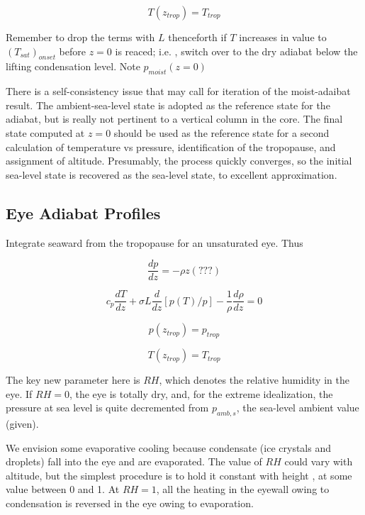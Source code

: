 \documentclass{article}
\begin{document}
\begin{equation}
	T(z_{trop} ) = T_{trop}
\end{equation}

Remember to drop the terms with $L$ thenceforth if $T$ increases in value to $(T_{sat})_{onset}$ before $z=0$ is reaced; i.e. , switch over to the dry adiabat below the lifting condensation level. Note $p_{moist}(z=0)$

There is a self-consistency issue that may call for iteration of the moist-adaibat result. The ambient-sea-level state is adopted as the reference state for the adiabat, but is really not pertinent to a vertical column in the core. The final state computed at $z=0$ should be used as the reference state for a second calculation of temperature vs pressure, identification of the tropopause, and assignment of altitude. Presumably, the process quickly converges, so the initial sea-level state is recovered as the sea-level state, to excellent approximation.

\subsection{Eye Adiabat Profiles}

Integrate seaward from the tropopause for an unsaturated eye. Thus

\begin{equation}
	\frac{dp}{dz} = - \rho z (???)
\end{equation}

\begin{equation}
	c_p \frac{dT}{dz} + \sigma L \frac{d}{dz} [ p(T) / p] - \frac{1}{\rho} \frac{d \rho}{d z} = 0
\end{equation}

\begin{equation}
	p(z_{trop}) = p_{trop} 
\end{equation}

\begin{equation}
	T(z_{trop} ) = T_{trop}
\end{equation}

The key new parameter here is $RH$, which denotes the relative humidity in the eye. If $RH=0$, the eye is totally dry, and, for the extreme idealization, the pressure at sea level is quite decremented from $p_{amb,s}$, the sea-level ambient value (given).

We envision some evaporative cooling because condensate (ice crystals and droplets) fall into the eye and are evaporated. The value of $RH$ could vary with altitude, but the simplest procedure is to hold it constant with height , at some value between 0 and 1. At $RH=1$, all the heating in the eyewall owing to condensation is reversed in the eye owing to evaporation.
\end{document}
